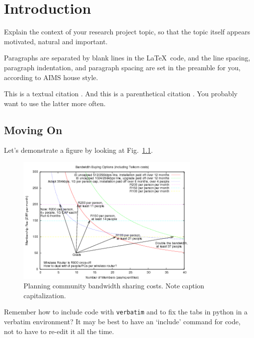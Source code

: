 \chapter{Introduction}

Explain the context of your research project topic, so that the
topic itself appears motivated, natural and important.

Paragraphs are separated by blank lines in the \LaTeX\ code, 
and the line spacing, paragraph indentation,
and paragraph spacing are set in the preamble for you, 
according to AIMS house style.

This is a textual citation \citet{shannon44}. And this is a parenthetical citation \citep{shannon44}. You probably want to use the latter more often.

\section{Moving On}
Let's demonstrate a figure by looking at Fig.~\ref{bandwidth}. 

\begin{figure}[!h]
\centering 
\includegraphics[width=0.8\textwidth]{images/bandwidth-colour.png}
\caption{Planning community bandwidth sharing costs. 
  Note caption capitalization.}
\label{bandwidth} 
\end{figure}

Remember how to include code with {\tt verbatim} 
and to fix the tabs in {\sf python} in a verbatim environment? 
It may be best to have an `include' command for code, 
not to have to re-edit it all the time.


